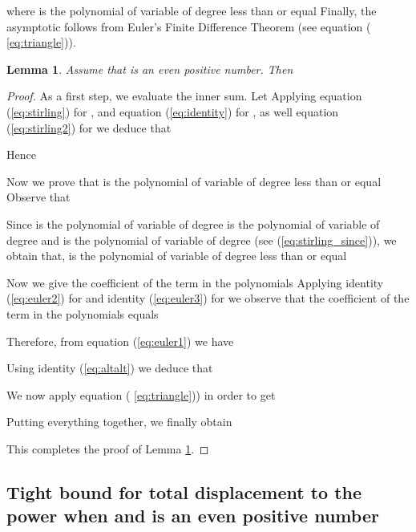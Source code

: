\documentclass[final,5p,times,twocolumn]{elsarticle_mod}
\newtheorem{Lemma}[theorem]{Lemma}
\begin{document}
where  is the polynomial of variable  of degree less than or equal 
Finally, the asymptotic follows from Euler's Finite Difference Theorem (see equation ( \ref{eq:triangle})).
\begin{Lemma}
\label{lem:sum}
Assume that  is an even positive number. Then

\end{Lemma}
\begin{proof}
As a first step, we evaluate the inner sum.
Let 
Applying equation (\ref{eq:stirling}) for  , 
and equation (\ref{eq:identity}) for  ,
as well equation (\ref{eq:stirling2}) for    we deduce that

Hence 

Now we prove that  is the polynomial of variable  of degree less than or equal 
Observe that

Since  is the polynomial of variable  of degree 
 is the polynomial of variable  of degree 
and  is the polynomial of variable  of degree  (see (\ref{eq:stirling_since})),
we obtain that,  is the polynomial of variable  of degree less than or equal  

Now we give the coefficient of the term  in the polynomials 
Applying identity (\ref{eq:euler2}) for   and identity (\ref{eq:euler3}) for
  we observe that the coefficient of the term  in the polynomials  equals

Therefore, from equation (\ref{eq:euler1}) we have

Using identity (\ref{eq:altalt}) we deduce that


We now apply equation ( \ref{eq:triangle})) in order to  get


Putting everything together, we finally obtain

This completes the proof of Lemma \ref{lem:sum}.
\end{proof}

\subsection{Tight bound for total displacement to the power  when  and  is an even positive number}
\end{document}
